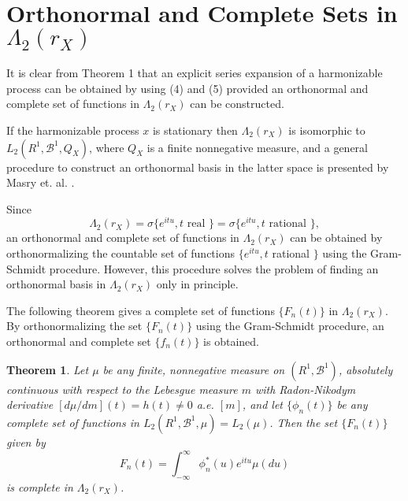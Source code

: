 \documentclass{article}
\newtheorem{theorem}{Theorem}
\begin{document}
\section*{Orthonormal and Complete Sets in $\Lambda_{2}(r_{X})$}

It is clear from Theorem 1 that an explicit series expansion of a harmonizable process can be obtained by using (4) and (5) provided an orthonormal and complete set of functions in $\Lambda_{2}(r_{X})$ can be constructed.

If the harmonizable process $x$ is stationary then $\Lambda_{2}(r_{X})$ is isomorphic to $L_{2}(R^{1}, \mathscr{B}^{1}, Q_{X})$, where $Q_{X}$ is a finite nonnegative measure, and a general procedure to construct an orthonormal basis in the latter space is presented by Masry et. al. \cite{masry1968}.

Since
\[
\Lambda_{2}(r_{X})=\sigma\{e^{i t u}, t \text{ real }\}=\sigma\{e^{i t u}, t \text{ rational }\},
\]
an orthonormal and complete set of functions in $\Lambda_{2}(r_{X})$ can be obtained by orthonormalizing the countable set of functions $\{e^{i t u}, t$ rational $\}$ using the Gram-Schmidt procedure. However, this procedure solves the problem of finding an orthonormal basis in $\Lambda_{2}(r_{X})$ only in principle.

The following theorem gives a complete set of functions $\{F_{n}(t)\}$ in $\Lambda_{2}(r_{X})$. By orthonormalizing the set $\{F_{n}(t)\}$ using the Gram-Schmidt procedure, an orthonormal and complete set $\{f_{n}(t)\}$ is obtained.

\begin{theorem}
Let $\mu$ be any finite, nonnegative measure on $(R^{1}, \mathscr{B}^{1})$, absolutely continuous with respect to the Lebesgue measure $m$ with Radon-Nikodym derivative $[d \mu / d m](t)=h(t) \neq 0$ a.e. $[m]$, and let $\{\phi_{n}(t)\}$ be any complete set of functions in $L_{2}(R^{1}, \mathscr{B}^{1}, \mu)=L_{2}(\mu)$. Then the set $\{F_{n}(t)\}$ given by
\[
F_{n}(t)=\int_{-\infty}^{\infty} \phi_{n}^{*}(u) e^{i t u} \mu(d u)
\]
is complete in $\Lambda_{2}(r_{X})$.
\end{theorem}
\end{document}
